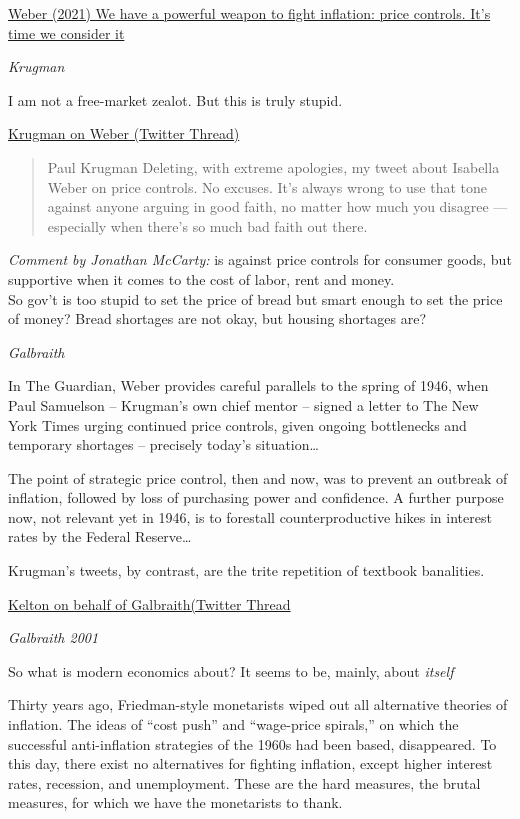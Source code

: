 \documentclass[
]{book}
\begin{document}
\href{https://www.theguardian.com/business/commentisfree/2021/dec/29/inflation-price-controls-time-we-use-it}{Weber (2021) We have a powerful weapon to fight inflation: price controls. It's time we consider it}

\emph{Krugman}

I am not a free-market zealot. But this is truly stupid.

\href{https://twitter.com/paulkrugman/status/1476551183414312971}{Krugman on Weber (Twitter Thread)}

\begin{quote}
Paul Krugman \citet{paulkrugman}
Deleting, with extreme apologies, my tweet about Isabella Weber on price controls. No excuses. It's always wrong to use that tone against anyone arguing in good faith, no matter how much you disagree --- especially when there's so much bad faith out there.
\end{quote}

\emph{Comment by Jonathan McCarty:}
\citet{paulkrugman}
is against price controls for consumer goods, but supportive when it comes to the cost of labor, rent and money.\\
So gov't is too stupid to set the price of bread but smart enough to set the price of money? Bread shortages are not okay, but housing shortages are?

\emph{Galbraith}

In The Guardian, Weber provides careful parallels to the spring of 1946, when Paul Samuelson -- Krugman's own chief mentor -- signed a letter to The New York Times urging continued price controls, given ongoing bottlenecks and temporary shortages -- precisely today's situation\ldots{}

The point of strategic price control, then and now, was to prevent an outbreak of inflation, followed by loss of purchasing power and confidence. A further purpose now, not relevant yet in 1946, is to forestall counterproductive hikes in interest rates by the Federal Reserve\ldots{}

Krugman's tweets, by contrast, are the trite repetition of textbook banalities.

\href{https://twitter.com/StephanieKelton/status/1476938880045797378}{Kelton on behalf of Galbraith(Twitter Thread}

\emph{Galbraith 2001}

So what is modern economics about? It seems to be, mainly, about \emph{itself}

Thirty years ago, Friedman-style monetarists wiped out all alternative theories of inflation. The ideas of ``cost push'' and ``wage-price spirals,'' on which the successful anti-inflation strategies of the 1960s had been based, disappeared. To this day, there exist no alternatives for fighting inflation, except higher interest rates, recession, and unemployment. These are the hard measures, the brutal measures, for which we have the monetarists to thank.
\end{document}
